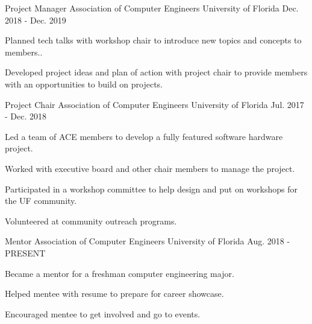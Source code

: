 


\begin{cventries}

\cventry
{Project Manager} %
{Association of Computer Engineers} %
{University of Florida} %
{Dec. 2018 - Dec. 2019} %
{ %
	\begin{cvitems}
		\setlength{\itemindent}{.125in}
		\item {Planned tech talks with workshop chair to introduce new topics and concepts to members..}
		\item {Developed project ideas and plan of action with project chair to provide members with an opportunities to build on projects.}
	\end{cvitems}
}



\cventry
{Project Chair} %
{Association of Computer Engineers} %
{University of Florida} %
{Jul. 2017 - Dec. 2018} %
{ %
\begin{cvitems}
\setlength{\itemindent}{.125in}
\item {Led a team of ACE members to develop a fully featured software hardware project.}
\item {Worked with executive board and other chair members to manage the project.}
\item {Participated in a workshop committee to help design and put on workshops for the UF community. }
\item {Volunteered at community outreach programs.}
\end{cvitems}
}


\cventry
{Mentor} %
{Association of Computer Engineers} %
{University of Florida} %
{Aug. 2018 - PRESENT} %
{ %
\begin{cvitems}
\setlength{\itemindent}{.125in}
\item {Became a mentor for a freshman computer engineering major.}
\item {Helped mentee with resume to prepare for career showcase.}
\item {Encouraged mentee to get involved and go to events.}
\end{cvitems}
}



\end{cventries}